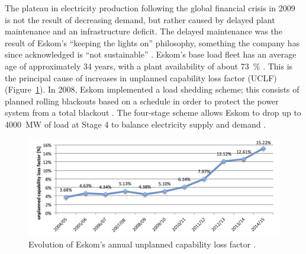 The plateau in electricity production following the global financial crisis in 2009 is not the result of decreasing demand, but rather caused by delayed plant maintenance and an infrastructure deficit. The delayed maintenance was the result of Eskom's \enquote{keeping the lights on} philosophy, something the company has since acknowledged is \enquote{not sustainable} \cite{Eskom2014}. Eskom's base load fleet has an average age of approximately 34 years, with a plant availability of about \SI{73}{\percent} \cite{Eskom2015c}. This is the principal cause of increases in unplanned capability loss factor (UCLF) (Figure~\ref{UCLF}). In 2008, Eskom implemented a load shedding scheme; this consists of planned rolling blackouts based on a schedule in order to protect the power system from a total blackout \cite{Eskom2015d}. The four-stage scheme allows Eskom to drop up to \SI{4000}{\mega\watt} of load at Stage 4 to balance electricity supply and demand \cite{Eskom2015e}.

\begin{figure}[htbp]  
\centering
\includegraphics[width=1\linewidth]{FIG/UCLF}
\caption[Evolution of Eskom's annual unplanned capability loss factor.]{Evolution of Eskom's annual unplanned capability loss factor \cite{Eskom2015b,Eskom2015d}.}\label{UCLF}
\end{figure}

